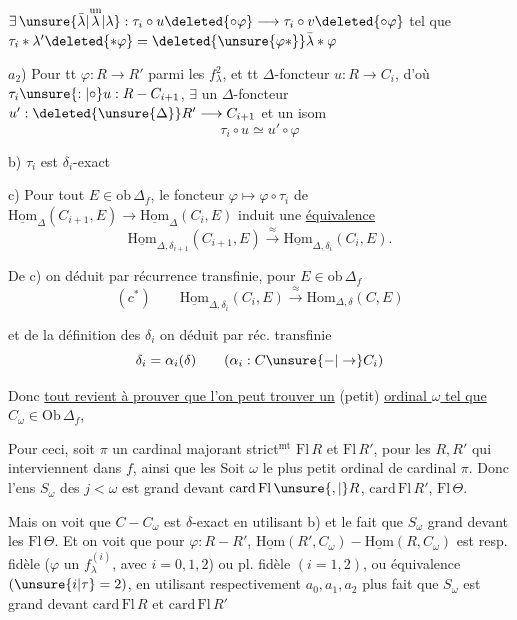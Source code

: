 \deleted{\unsure{$\exists$}} $\exists\,\unsure{\bar\lambda|\overset{\text{un}}{\lambda}|\lambda}:\tau_i\circ u\deleted{\circ\varphi}\longrightarrow\tau_i\circ v\deleted{\circ\varphi}$ tel que $\tau_i*\lambda'\deleted{*\varphi}=\deleted{\unsure{\varphi*}}\bar\lambda*\varphi$

$a_2$) Pour tt $\varphi:R\longrightarrow R'$ parmi les $f^2_\lambda$, et tt $\Delta$-foncteur $u:R\longrightarrow C_i$, \deleted{$\exists$} d'où $\tau_i\unsure{:|\circ}u:R-C_{i+1}$, $\exists$ un $\Delta$-foncteur $u':\deleted{\unsure{\Delta}}R'\longrightarrow C_{i+1}$ et un isom
\[
\tau_i\circ u\simeq u'\circ\varphi
\]


b) $\tau_i$ est $\delta_i$-exact

c) Pour tout $E\in\mathrm{ob}\,\Delta_f$, le foncteur $\varphi\longmapsto\varphi\circ\tau_i$ de $\underline{\mathrm{Hom}}_\Delta(C_{i+1},E)\longrightarrow\underline{\mathrm{Hom}}_\Delta(C_i,E)$ induit une \uline{équivalence}
\[
\underline{\mathrm{Hom}}_{\Delta,\delta_{i+1}}(C_{i+1},E)\xrightarrow{\approx}\underline{\mathrm{Hom}}_{\Delta,\delta_i}(C_i,E).
\]


De c) on déduit par récurrence transfinie, pour $E\in\mathrm{ob}\,\Delta_f$
\[
(c^*)\qquad \underline{\mathrm{Hom}}_{\Delta,\delta_i}(C_i,E)\xrightarrow{\approx}\mathrm{Hom}_{\Delta,\delta}(C,E)
\]

et de la définition des $\delta_i$ on déduit par réc. transfinie
\[
\delta_i=\alpha_i(\delta)\qquad(\alpha_i:C\unsure{-|\to}C_i)
\]

Donc \uline{tout revient à prouver que l'on peut trouver un} (petit) \uline{ordinal $\omega$ tel que} $C_\omega\in\mathrm{Ob}\,\Delta_f$, 

Pour ceci, soit $\pi$ un cardinal majorant strict$^{\mathrm{mt}}$ $\mathrm{Fl}\,R$ et $\mathrm{Fl}\,R'$,  pour les $R,R'$ qui interviennent dans $f$, ainsi que les  Soit $\omega$ le plus petit ordinal de cardinal $\pi$. Donc l'ens $S_\omega$ des $j<\omega$ est grand devant $\mathrm{card}\,\mathrm{Fl}\,\unsure{,|{}}R$, $\mathrm{card}\,\mathrm{Fl}\,R'$, $\mathrm{Fl}\,\Theta$.

Mais on voit que $C-C_\omega$ est $\delta$-exact en utilisant b) et le fait que $S_\omega$ grand devant les  $\mathrm{Fl}\,\Theta$. Et on voit que pour $\varphi:R-R'$, $\underline{\mathrm{Hom}}(R',C_\omega)-\underline{\mathrm{Hom}}(R,C_\omega)$ est resp. fidèle ($\varphi$ un $f^{(i)}_\lambda$, avec $i=0,1,2$) ou pl. fidèle $(i=1,2)$, ou équivalence $(\unsure{i|\tau}=2)$, en utilisant respectivement $a_0,a_1,a_2$ plus  fait que $S_\omega$ est grand devant  $\mathrm{card}\,\mathrm{Fl}\,R$ et $\mathrm{card}\,\mathrm{Fl}\,R'$

